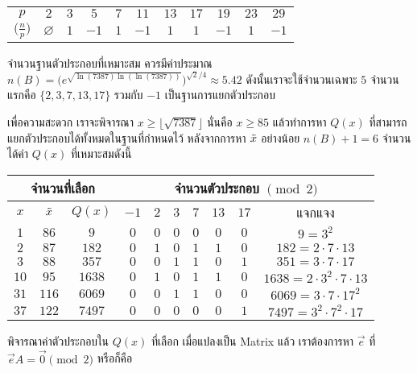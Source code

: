 \documentclass[20pt,a4paper]{article}
\begin{document}
\begin{center}
\begin{tabular}{ |c|cccccccccc| } 
 \hline
 $p$ & $2$ & $3$ & $5$ & $7$ & $11$ & $13$ & $17$ & $19$ & $23$ & $29$ \\ 
 $\big( \frac{n}{p} \big)$ & $\varnothing$ & $1$ & $-1$ & $1$ & $-1$ & $1$ & $1$ & $-1$ & $1$ & $-1$ \\ 
 \hline
\end{tabular}
\end{center}

จำนวนฐานตัวประกอบที่เหมาะสม ควรมีค่าประมาณ $n(B) = \big(e^{\sqrt{\ln{(7387)}\ln{(\ln{(7387)})}}}\big)^{\sqrt{2}/4} \approx 5.42$ ดังนั้นเราจะใช้จำนวนเฉพาะ $5$ จำนวนแรกคือ $\{2,3,7,13,17\}$ รวมกับ $-1$ เป็นฐานการแยกตัวประกอบ

เพื่อความสะดวก เราจะพิจารณา $x \geq \lfloor\sqrt{7387}\rfloor$ นั่นคือ $x \geq 85$ แล้วทำการหา $Q(x)$ ที่สามารถแยกตัวประกอบได้ทั้งหมดในฐานที่กำหนดไว้ หลังจากการหา $\Tilde{x}$ อย่างน้อย $n(B)+1 = 6$ จำนวน ได้ค่า $Q(x)$ ที่เหมาะสมดังนี้

\begin{center}
\begin{tabular}{ |c|c|c|cccccc|c| } 
 \hline
 \multicolumn{3}{|c|}{จำนวนที่เลือก} & \multicolumn{7}{|c|}{จำนวนตัวประกอบ $\pmod{2}$} \\
 \hline
 $x$ & $\Tilde{x}$ & $Q(x)$ & $-1$ & $2$ & $3$ & $7$ & $13$ & $17$ & แจกแจง \\ 
 \hline
 $1$ & $86$ & $9$ & $0$ & $0$ & $0$ & $0$ & $0$ & $0$ & $9 = 3^2$ \\ 
 $2$ & $87$ & $182$ & $0$ & $1$ & $0$ & $1$ & $1$ & $0$ & $182 = 2\cdot 7 \cdot 13$ \\ 
 $3$ & $88$ & $357$ & $0$ & $0$ & $1$ & $1$ & $0$ & $1$ & $351 = 3\cdot 7 \cdot 17$ \\ 
 $10$ & $95$ & $1638$ & $0$ & $1$ & $0$ & $1$ & $1$ & $0$ & $1638 = 2 \cdot 3^2\cdot 7 \cdot 13$ \\ 
 $31$ & $116$ & $6069$ & $0$ & $0$ & $1$ & $1$ & $0$ & $0$ & $6069 = 3 \cdot 7\cdot 17^2$ \\
 $37$ & $122$ & $7497$ & $0$ & $0$ & $0$ & $0$ & $0$ & $1$ & $7497 = 3^2\cdot 7^2 \cdot 17$ \\
 \hline
\end{tabular}
\end{center}


พิจารณาค่าตัวประกอบใน $Q(x)$ ที่เลือก เมื่อแปลงเป็น Matrix แล้ว เราต้องการหา $\vec{e}$ ที่  $\vec{e}A = \vec{0}\pmod{2}$ หรือก็คือ
\end{document}
